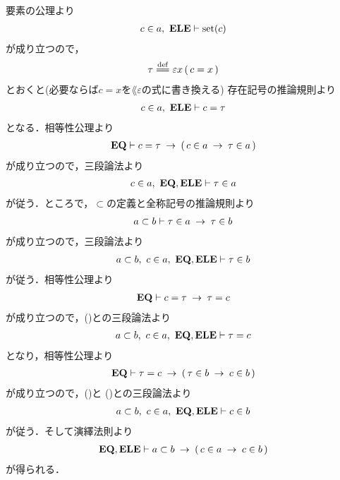 	\begin{prf}	
		要素の公理より
		\begin{align}
			c \in a,\ \mbox{{\bf ELE}} \vdash \operatorname*{set} (c)
		\end{align}
		が成り立つので，
		\begin{align}
			\tau \defeq \varepsilon x\, (\, c=x\, )
		\end{align}
		とおくと(必要ならば$c = x$を$\lang{\varepsilon}$の式に書き換える)
		存在記号の推論規則より
		\begin{align}
			c \in a,\ \mbox{{\bf ELE}} \vdash c = \tau
			\label{fom:subclass_contains_all_elements_1}
		\end{align}
		となる．相等性公理より
		\begin{align}
			\mbox{{\bf EQ}} \vdash c = \tau \hspace{0.25em}\rightarrow\hspace{0.25em} (\, c \in a \hspace{0.25em}\rightarrow\hspace{0.25em} \tau \in a\, )
		\end{align}
		が成り立つので，三段論法より
		\begin{align}
			c \in a,\ \mbox{{\bf EQ}},\mbox{{\bf ELE}} \vdash \tau \in a
		\end{align}
		が従う．ところで，$\subset$の定義と全称記号の推論規則より
		\begin{align}
			a \subset b \vdash \tau \in a \hspace{0.25em}\rightarrow\hspace{0.25em} \tau \in b
		\end{align}
		が成り立つので，三段論法より
		\begin{align}
			a \subset b,\ c \in a,\ \mbox{{\bf EQ}},\mbox{{\bf ELE}} \vdash \tau \in b
			\label{fom:subclass_contains_all_elements_2}
		\end{align}
		が従う．相等性公理より
		\begin{align}
			\mbox{{\bf EQ}} \vdash c = \tau \hspace{0.25em}\rightarrow\hspace{0.25em} \tau = c
		\end{align}
		が成り立つので，()との三段論法より
		\begin{align}
			a \subset b,\ c \in a,\ \mbox{{\bf EQ}},\mbox{{\bf ELE}} \vdash \tau = c
			\label{fom:subclass_contains_all_elements_3}
		\end{align}
		となり，相等性公理より
		\begin{align}
			\mbox{{\bf EQ}} \vdash \tau = c \hspace{0.25em}\rightarrow\hspace{0.25em} (\, \tau \in b \hspace{0.25em}\rightarrow\hspace{0.25em} c \in b\, )
		\end{align}
		が成り立つので，()と
		()との三段論法より
		\begin{align}
			a \subset b,\ c \in a,\ \mbox{{\bf EQ}},\mbox{{\bf ELE}} \vdash c \in b
		\end{align}
		が従う．そして演繹法則より
		\begin{align}
			\mbox{{\bf EQ}},\mbox{{\bf ELE}} \vdash 
			a \subset b \hspace{0.25em}\rightarrow\hspace{0.25em} (\, c \in a \hspace{0.25em}\rightarrow\hspace{0.25em} c \in b\, )
		\end{align}
		が得られる．
		\QED
	\end{prf}
	
